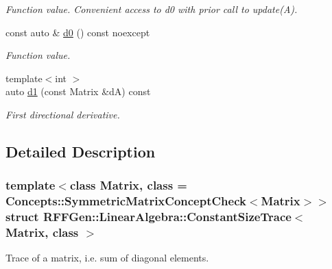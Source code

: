 \begin{DoxyCompactItemize}
\begin{DoxyCompactList}\small\item\em Function value. Convenient access to d0 with prior call to update(\-A). \end{DoxyCompactList}\item 
\hypertarget{structRFFGen_1_1LinearAlgebra_1_1ConstantSizeTrace_a5a96a8d7a1adbbb5f5e22e7f6a26727b}{const auto \& \hyperlink{structRFFGen_1_1LinearAlgebra_1_1ConstantSizeTrace_a5a96a8d7a1adbbb5f5e22e7f6a26727b}{d0} () const noexcept}\label{structRFFGen_1_1LinearAlgebra_1_1ConstantSizeTrace_a5a96a8d7a1adbbb5f5e22e7f6a26727b}

\begin{DoxyCompactList}\small\item\em Function value. \end{DoxyCompactList}\item 
\hypertarget{structRFFGen_1_1LinearAlgebra_1_1ConstantSizeTrace_a3d21fef989ae6d57cf64a282a8ee4cd0}{{\footnotesize template$<$int $>$ }\\auto \hyperlink{structRFFGen_1_1LinearAlgebra_1_1ConstantSizeTrace_a3d21fef989ae6d57cf64a282a8ee4cd0}{d1} (const Matrix \&d\-A) const }\label{structRFFGen_1_1LinearAlgebra_1_1ConstantSizeTrace_a3d21fef989ae6d57cf64a282a8ee4cd0}

\begin{DoxyCompactList}\small\item\em First directional derivative. \end{DoxyCompactList}\end{DoxyCompactItemize}


\subsection{Detailed Description}
\subsubsection*{template$<$class Matrix, class = Concepts\-::\-Symmetric\-Matrix\-Concept\-Check$<$\-Matrix$>$$>$struct R\-F\-F\-Gen\-::\-Linear\-Algebra\-::\-Constant\-Size\-Trace$<$ Matrix, class $>$}

Trace of a matrix, i.\-e. sum of diagonal elements. 

